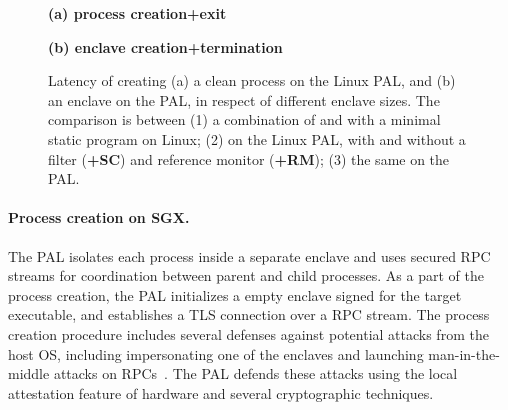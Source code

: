 \begin{figure*}[t!]
\centering
\footnotesize
{}
\parbox{0.59\textwidth}{\centering\bf (a) process creation+exit}
\parbox{0.39\textwidth}{\centering\bf (b) \sgx{} enclave creation+termination}
\caption{Latency of creating (a) a clean process on the Linux PAL, and (b) an enclave on the \sgx{} PAL, in respect of different enclave sizes.
The comparison is between (1) a combination of  and  with a minimal static program on Linux; (2)  on the Linux PAL, with and without a \seccomp{} filter ({\bf +SC}) and reference monitor ({\bf +RM}); (3) the same \hostapi{} on the \sgx{} PAL.}
\label{fig:eval:pal:proc-latency}
\end{figure*}













\paragraph{Process creation on SGX.}
The \sgx{} PAL isolates each process inside a separate enclave
and uses secured RPC streams
for coordination between parent and child processes.
As a part of the process creation,
the \sgx{} PAL initializes a empty enclave
signed for the target executable,
and establishes a TLS connection over a RPC stream.
The process creation procedure
includes several defenses against potential attacks
from the host OS,
including impersonating one of the enclaves and launching man-in-the-middle attacks on RPCs~\cite{shinde17panoply}.
The \sgx{} PAL defends these attacks
using the local attestation feature of \sgx{} hardware and several cryptographic techniques.



